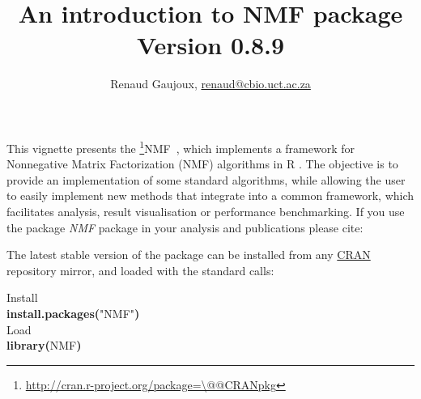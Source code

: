 \documentclass[a4paper]{article}\usepackage{graphicx, color}
\makeatletter
\newcommand{\hlfunctioncall}[1]{\textcolor[rgb]{0.501960784313725,0,0.329411764705882}{\textbf{#1}}}%
\newcommand{\hlstring}[1]{\textcolor[rgb]{0.6,0.6,1}{#1}}%
\newcommand{\hlkeyword}[1]{\textcolor[rgb]{0,0,0}{\textbf{#1}}}%
\newcommand{\hlcomment}[1]{\textcolor[rgb]{0.180392156862745,0.6,0.341176470588235}{#1}}%
\newcommand{\hlsymbol}[1]{\textcolor[rgb]{0,0,0}{#1}}%
\newcommand{\hlstd}[1]{\textcolor[rgb]{0,0,0}{#1}}%
\newenvironment{kframe}{%
 \def\FrameCommand##1{\hskip\@totalleftmargin \hskip-\fboxsep
 \colorbox{shadecolor}{##1}\hskip-\fboxsep
     \hskip-\linewidth \hskip-\@totalleftmargin \hskip\columnwidth}%
 \MakeFramed {\advance\hsize-\width
   \@totalleftmargin\z@ \linewidth\hsize
   \@setminipage}}%
 {\par\unskip\endMakeFramed}
\newenvironment{knitrout}{}{} %
\newcommand{\pkgname}[1]{\textit{#1}\xspace}
\newcommand{\Rpkg}[1]{\pkgname{#1} package\xspace}
\newcommand{\CRANurl}[1]{\url{http://cran.r-project.org/package=#1}}
\def\CRANpkg{\@ifstar\@CRANpkg\@@CRANpkg}
\def\@CRANpkg#1{\href{http://cran.r-project.org/package=#1}{\pkgname{#1}}\footnote{\CRANurl{#1}}}
\def\@@CRANpkg#1{\href{http://cran.r-project.org/package=#1}{\pkgname{#1}} package\footnote{\CRANurl{#1}}}
\newcommand{\citeCRANpkg}[1]{\CRANpkg{#1}~\cite{#1}}
\newcommand{\nmfpack}{\Rpkg{NMF}}
\makeatother
\begin{document}




\title{An introduction to NMF package\\\small Version
0.8.9}
\author{Renaud Gaujoux, \url{renaud@cbio.uct.ac.za}}

\maketitle

This vignette presents the \citeCRANpkg{NMF}, which implements a framework
for Nonnegative Matrix Factorization (NMF) algorithms in R \cite{R}.
The objective is to provide an implementation of some standard algorithms, while
allowing the user to easily implement new methods that integrate into a
common framework, which facilitates analysis, result visualisation or
performance benchmarking.
If you use the package \nmfpack in your analysis and publications please cite:

\bigskip
{}

The latest stable version of the package can be installed from any
\href{http://cran.r-project.org}{CRAN} repository mirror, and loaded with the
standard calls:
\begin{knitrout}
\color{fgcolor}\begin{kframe}
\begin{flushleft}
\ttfamily\noindent
\hlcomment{\usebox{\hlnormalsizeboxhash}{\ }Install}\hspace*{\fill}\\
\hlstd{}\hlfunctioncall{install.packages}\hlkeyword{(}\hlstring{"{}NMF"{}}\hlkeyword{)}\hspace*{\fill}\\
\hlstd{}\hlcomment{\usebox{\hlnormalsizeboxhash}{\ }Load}\hspace*{\fill}\\
\hlstd{}\hlfunctioncall{library}\hlkeyword{(}\hlsymbol{NMF}\hlkeyword{)}\mbox{}
\normalfont
\end{flushleft}
\end{kframe}
\end{knitrout}
\end{document}
